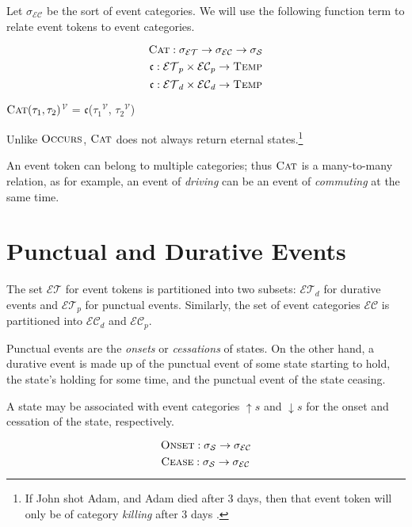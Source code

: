Let $\sigma_\mathcal{EC}$ be the sort of event categories. We will use the following function term to relate event tokens to event categories.

\[
	\textsc{Cat}: \sigma_\mathcal{ET} \to \sigma_\mathcal{EC} \to \sigma_\mathcal{S}
\]
$$\mathfrak{c} : \mathcal{ET}_p \times \mathcal{EC}_p \to \textsc{Temp}$$
$$\mathfrak{c} : \mathcal{ET}_d \times \mathcal{EC}_d \to \textsc{Temp}$$

\textlbrackdbl $\textsc{Cat}(\tau_1, \tau_2)$\textrbrackdbl$^{\mathcal{V}}$ = $\mathfrak{c}$(\textlbrackdbl $\tau_1$\textrbrackdbl$^{\mathcal{V}}$, \textlbrackdbl $\tau_2$\textrbrackdbl$^{\mathcal{V}}$)

Unlike $\textsc{Occurs}$, $\textsc{Cat}$ does not always return eternal states.\footnote{If John shot Adam, and Adam died after 3 days, then that event token will only be of category \textit{killing} after 3 days \cite{timeofakilling}.}

An event token can belong to multiple categories; thus $\textsc{Cat}$ is a many-to-many relation, as for example, an event of
\textit{driving} can be an event of \textit{commuting} at the same time.

\section{Punctual and Durative Events}

The set $\mathcal{ET}$ for event tokens is partitioned into two subsets: $\mathcal{ET}_d$ for durative events and $\mathcal{ET}_p$ for punctual events.
Similarly, the set of event categories $\mathcal{EC}$ is partitioned into $\mathcal{EC}_d$ and $\mathcal{EC}_p$.

Punctual events are the \textit{onsets} or \textit{cessations} of states. On the other hand, a durative event is made up
of the punctual event of some state starting to hold, the state's holding for some time, and the punctual event of the state ceasing.

A state may be associated with event categories $\uparrow s$ and $\downarrow s$ for the onset and cessation of the state, respectively.

\begin{equation}
	\textsc{Onset} : \sigma_{\mathcal{S}} \to \sigma_{\mathcal{EC}}
\end{equation}
\begin{equation}
	\textsc{Cease} : \sigma_{\mathcal{S}} \to \sigma_{\mathcal{EC}}
\end{equation}

